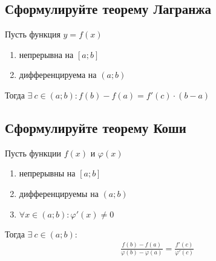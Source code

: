 \subsection{Сформулируйте теорему Лагранжа}
\begin{theorem}
Пусть функция $y=f(x)$
\begin{enumerate}
\item непрерывна на $[a;b]$
\item дифференцируема на $(a;b)$
\end{enumerate}
Тогда $\exists\ c \in (a;b)\colon \boxed{f(b) - f(a) = f'(c) \cdot (b-a)}$
\end{theorem}

\subsection{Сформулируйте теорему Коши}
\begin{theorem}
Пусть функции $f(x)$ и $\varphi (x)$
\begin{enumerate}
\item непрерывны на $[a;b]$
\item дифференцируемы на $(a;b)$
\item $\forall x \in (a;b)\colon \varphi' (x) \ne 0$
\end{enumerate}
Тогда $\exists\ c \in (a;b)\colon$ \vspace{-\topsep}
\begin{gather*}
\boxed{\frac{f(b) - f(a)}{\varphi (b) - \varphi (a)} = \frac{f'(c)}{\varphi'(c)}}
\end{gather*}
\end{theorem}



